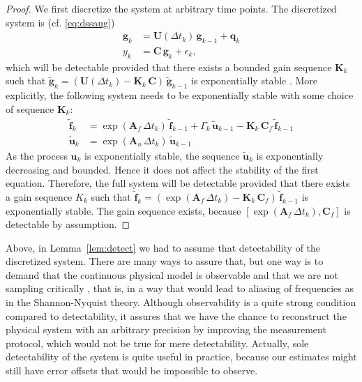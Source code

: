 \documentclass[journal]{IEEEtran}
\begin{document}
\begin{proof}
We first discretize the system at arbitrary time points. The discretized system is (cf. \eqref{eq:dssaug})
%
\begin{equation}
\begin{split}
   \mathbf{g}_k &= \mathbf{U}(\Delta t_k) \, \mathbf{g}_{k-1} +  \mathbf{q}_k \\
  y_k &=  \mathbf{C} \,  \mathbf{g}_k + \epsilon_k,
\end{split}
\end{equation}
%
which will be detectable provided that there exists a bounded gain sequence $\mathbf{K}_k$ such that $\tilde{\mathbf{g}}_k = (\mathbf{U}(\Delta t_k) - \mathbf{K}_k \, \mathbf{C}) \, \tilde{\mathbf{g}}_{k-1}$ is exponentially stable \cite{Anderson:1981}. More explicitly, the following system needs to be exponentially stable with some choice of sequence $\mathbf{K}_k$:
%
\begin{equation}
\begin{split}
  \tilde{\mathbf{f}}_k &= \exp(\mathbf{A}_f \, \Delta t_k) \, \tilde{\mathbf{f}}_{k-1}
  + \Gamma_k \, \tilde{\mathbf{u}}_{k-1} - \mathbf{K}_k \, \mathbf{C}_f \, \tilde{\mathbf{f}}_{k-1} \\
  \tilde{\mathbf{u}}_k &= \exp(\mathbf{A}_u \, \Delta t_k) \, \tilde{\mathbf{u}}_{k-1} 
\end{split}
\end{equation}
%
As the process $\mathbf{u}_k$ is exponentially stable, the sequence $\tilde{\mathbf{u}}_k$ is exponentially decreasing and bounded. Hence it does not affect the stability of the first equation. Therefore, the full system will be detectable provided that there exists a gain sequence $K_k$ such that $\tilde{\mathbf{f}}_k = (\exp(\mathbf{A}_f \, \Delta t_k) - \mathbf{K}_k \, \mathbf{C}_f) \, \tilde{\mathbf{f}}_{k-1}$ is exponentially stable. The gain sequence exists, because $[\exp(\mathbf{A}_f \, \Delta t_k),\mathbf{C}_f]$ is detectable by assumption. 
\end{proof}

Above, in Lemma~\ref{lem:detect} we had to assume that detectability of the discretized system. There are many ways to assure that, but one way is to demand that the continuous physical model is observable and that we are not sampling critically \cite{Ding:2009}, that is, in a way that would lead to aliasing of frequencies as in the Shannon-Nyquist theory. Although observability is a quite strong condition compared to detectability, it assures that we have the chance to reconstruct the physical system with an arbitrary precision by improving the measurement protocol, which would not be true for mere detectability. Actually, sole detectability of the system is quite useful in practice, because our estimates might still have error offsets that would be impossible to observe.
\end{document}
